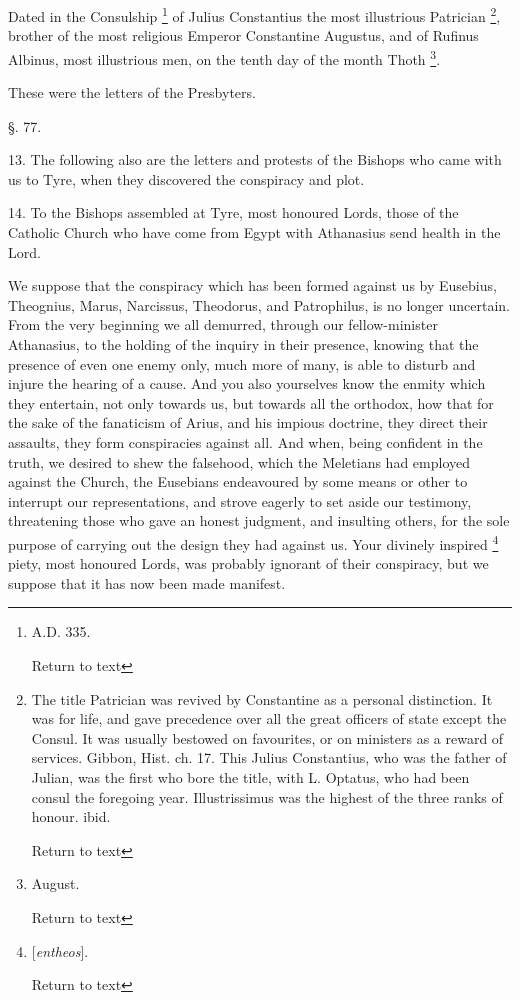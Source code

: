 Dated in the Consulship \footnote{A.D.
335.

Return to text} of Julius Constantius the most illustrious Patrician \footnote{The title Patrician was revived by Constantine as a personal
distinction. It was for life, and gave precedence over all the great
officers of state except the Consul. It was usually bestowed on
favourites, or on ministers as a reward of services. Gibbon, Hist. ch.
17. This Julius Constantius, who was the father of Julian, was the
first who bore the title, with L. Optatus, who had been consul the
foregoing year. Illustrissimus was the highest of the three ranks of
honour. ibid.

Return to text}, brother of the most religious Emperor Constantine Augustus,
and of Rufinus Albinus, most illustrious men, on the tenth day of the
month Thoth \footnote{August.

Return to text}.

These were the letters of the Presbyters.

§. 77.

13. The following also are the letters and
protests of the Bishops who came with us to Tyre, when they discovered
the conspiracy and plot.

14. To the Bishops assembled at Tyre, most
honoured Lords, those of the Catholic Church who have come from Egypt
with Athanasius send health in the Lord.

We suppose that the conspiracy which has been
formed against us by Eusebius, Theognius, Marus, Narcissus, Theodorus,
and Patrophilus, is no longer uncertain. From the very beginning we
all demurred, through our fellow-minister Athanasius, to the holding
of the inquiry in their presence, knowing that the presence of even
one enemy only, much more of many, is able to disturb and injure the
hearing of a cause. And you also yourselves know the enmity which they
entertain, not only towards us, but towards all the orthodox, how that
for the sake of the fanaticism of Arius, and his impious doctrine,
they direct their assaults, they form conspiracies against all. And
when, being confident in the truth, we desired to shew the falsehood,
which the Meletians had employed against the Church, the Eusebians
endeavoured by some means or other to interrupt our representations,
and strove eagerly to set aside our testimony, threatening those who
gave an honest judgment, and insulting others, for the sole purpose of
carrying out the design they had against us. Your divinely inspired \footnote{[\emph{entheos}].

Return to text} piety, most honoured Lords, was probably ignorant of their
conspiracy, but we suppose that it has now been made manifest.


